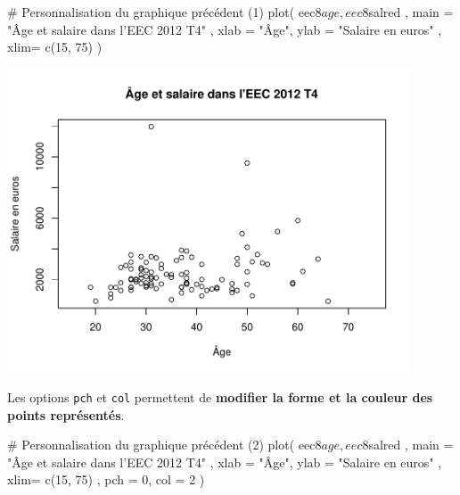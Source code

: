 \documentclass[12pt,twosided, notitlepage]{book}
\newenvironment{Shaded}{}{}
\newcommand{\CommentTok}[1]{\textcolor[rgb]{0.00,0.50,0.00}{#1}}
\newcommand{\DataTypeTok}[1]{#1}
\newcommand{\DecValTok}[1]{#1}
\newcommand{\KeywordTok}[1]{\textcolor[rgb]{0.00,0.00,1.00}{#1}}
\newcommand{\NormalTok}[1]{#1}
\newcommand{\OperatorTok}[1]{#1}
\newcommand{\StringTok}[1]{\textcolor[rgb]{0.00,0.50,0.50}{#1}}
\renewenvironment{Shaded}{\begin{snugshade}}{\end{snugshade}}
\begin{document}
\begin{Shaded}
\begin{Highlighting}[]
\CommentTok{# Personnalisation du graphique précédent (1)}
\KeywordTok{plot}\NormalTok{(}
\NormalTok{  eec8}\OperatorTok{$}\NormalTok{age, eec8}\OperatorTok{$}\NormalTok{salred}
\NormalTok{  , }\DataTypeTok{main =} \StringTok{"Âge et salaire dans l'EEC 2012 T4"}
\NormalTok{  , }\DataTypeTok{xlab =} \StringTok{"Âge"}\NormalTok{, }\DataTypeTok{ylab =} \StringTok{"Salaire en euros"}
\NormalTok{  , }\DataTypeTok{xlim=} \KeywordTok{c}\NormalTok{(}\DecValTok{15}\NormalTok{, }\DecValTok{75}\NormalTok{)}
\NormalTok{)}
\end{Highlighting}
\end{Shaded}

\begin{center}\includegraphics[width=12cm]{livret_files/figure-latex/unnamed-chunk-436-1} \end{center}

Les options \texttt{pch} et \texttt{col} permettent de \textbf{modifier
la forme et la couleur des points représentés}.

\begin{Shaded}
\begin{Highlighting}[]
\CommentTok{# Personnalisation du graphique précédent (2)}
\KeywordTok{plot}\NormalTok{(}
\NormalTok{  eec8}\OperatorTok{$}\NormalTok{age, eec8}\OperatorTok{$}\NormalTok{salred}
\NormalTok{  , }\DataTypeTok{main =} \StringTok{"Âge et salaire dans l'EEC 2012 T4"}
\NormalTok{  , }\DataTypeTok{xlab =} \StringTok{"Âge"}\NormalTok{, }\DataTypeTok{ylab =} \StringTok{"Salaire en euros"}
\NormalTok{  , }\DataTypeTok{xlim=} \KeywordTok{c}\NormalTok{(}\DecValTok{15}\NormalTok{, }\DecValTok{75}\NormalTok{)}
\NormalTok{  , }\DataTypeTok{pch =} \DecValTok{0}\NormalTok{, }\DataTypeTok{col =} \DecValTok{2}
\NormalTok{)}
\end{Highlighting}
\end{Shaded}
\end{document}
